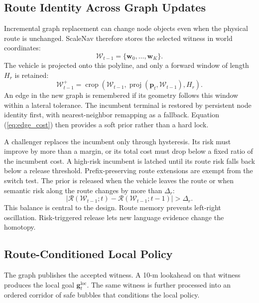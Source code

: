 \documentclass[letterpaper,10pt,conference]{ieeeconf}
\newcommand{\vect}[1]{\boldsymbol{#1}}
\begin{document}
\subsection{Route Identity Across Graph Updates}
Incremental graph replacement can change node objects even when the physical
route is unchanged.
ScaleNav therefore stores the selected witness in world coordinates:
\begin{equation}
 \mathcal{W}_{t-1}=\{\vect{w}_0,\ldots,\vect{w}_K\}.
\end{equation}
The vehicle is projected onto this polyline, and only a forward window of
length $H_r$ is retained:
\begin{equation}
 \mathcal{W}^{+}_{t-1}=
 \operatorname{crop}(\mathcal{W}_{t-1},
                     \operatorname{proj}(\vect{p}_t,\mathcal{W}_{t-1}),H_r).
\end{equation}
An edge in the new graph is remembered if its geometry follows this window
within a lateral tolerance.
The incumbent terminal is restored by persistent node identity first, with
nearest-neighbor remapping as a fallback.
Equation (\ref{eq:edge_cost}) then provides a soft prior rather than a hard
lock.

A challenger replaces the incumbent only through hysteresis. Its risk must
improve by more than a margin, or its total cost must drop below a fixed
ratio of the incumbent cost.
A high-risk incumbent is latched until its route risk falls back below a
release threshold. Prefix-preserving route extensions are exempt from the
switch test.
The prior is released when the vehicle leaves the route or when semantic
risk along the route changes by more than $\Delta_r$:
\begin{equation}
 \left|\mathcal{R}(\mathcal{W}_{t-1};t)-
        \mathcal{R}(\mathcal{W}_{t-1};t-1)\right|>\Delta_r.
\end{equation}
This balance is central to the design. Route memory prevents left-right
oscillation. Risk-triggered release lets new language evidence change the
homotopy.

\subsection{Route-Conditioned Local Policy}
The graph publishes the accepted witness. A 10-m lookahead on that witness
produces the local goal $\vect{g}^{\mathrm{loc}}_t$.
The same witness is further processed into an ordered corridor of safe
bubbles that conditions the local policy.
\end{document}
